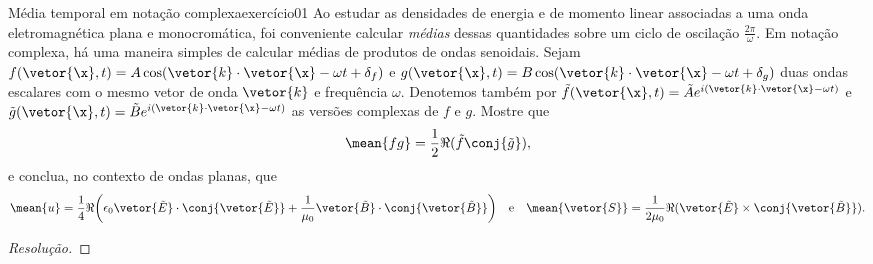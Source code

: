 \begin{exercício}{Média temporal em notação complexa}{exercício01}
    Ao estudar as densidades de energia e de momento linear associadas a uma onda eletromagnética plana e monocromática, foi conveniente calcular \emph{médias} dessas quantidades sobre um ciclo de oscilação \(\frac{2\pi}{\omega}\). Em notação complexa, há uma maneira simples de calcular médias de produtos de ondas senoidais. Sejam \(f(\vetor{\x}, t) = A \cos(\vetor{k}\cdot \vetor{\x} - \omega t + \delta_f)\) e \(g(\vetor{\x}, t) = B \cos(\vetor{k}\cdot \vetor{\x} - \omega t + \delta_g)\) duas ondas escalares com o mesmo vetor de onda \(\vetor{k}\) e frequência \(\omega\). Denotemos também por \(\tilde{f}(\vetor{\x}, t) = \tilde{A} e^{i(\vetor{k}\cdot\vetor{\x} - \omega t)}\) e \(\tilde{g}(\vetor{\x}, t) = \tilde{B} e^{i(\vetor{k}\cdot \vetor{\x} - \omega t)}\) as versões complexas de \(f\) e \(g\). Mostre que
    \begin{equation*}
        \mean{fg} = \frac12 \Re{(\tilde{f} \conj{\tilde{g}})},
    \end{equation*}
    e conclua, no contexto de ondas planas, que
    \begin{equation*}
        \mean{u} = \frac14 \Re{\left(\epsilon_0 \vetor{\tilde{E}} \cdot \conj{\vetor{\tilde{E}}} + \frac1{\mu_0} \vetor{\tilde{B}}\cdot \conj{\vetor{\tilde{B}}}\right)}
        \quad\text{e}\quad
        \mean{\vetor{S}} = \frac1{2\mu_0} \Re(\vetor{\tilde{E}}\times \conj{\vetor{\tilde{B}}}).
    \end{equation*}
\end{exercício}
\begin{proof}[Resolução]

\end{proof}
